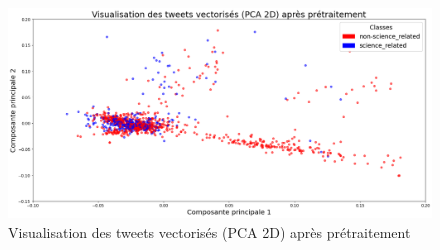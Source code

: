 \begin{figure}[H]
    \centering
    \includegraphics[width=\textwidth]{images/PCA-APT}
    \caption{Visualisation des tweets vectorisés (PCA 2D) après prétraitement}
    \label{fig:pca-apt}
\end{figure}